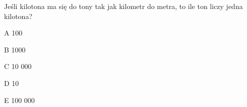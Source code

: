 \begin{tresc}
Jeśli kilotona ma się do tony tak jak kilometr do metra, to ile ton liczy jedna kilotona?
\end{tresc}
\begin{wariant}{A} 100 \end{wariant}
\begin{wariant}{B} 1000 \end{wariant}
\begin{wariant}{C} 10 000 \end{wariant}
\begin{wariant}{D} 10 \end{wariant}
\begin{wariant}{E} 100 000 \end{wariant}
